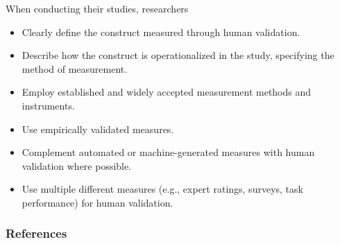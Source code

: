 When conducting their studies, researchers

\must
\begin{itemize}
    \item Clearly define the construct measured through human validation.
    \item Describe how the construct is operationalized in the study, specifying the method of measurement.
    \item Employ established and widely accepted measurement methods and instruments.
\end{itemize}


\should
\begin{itemize}
    \item Use empirically validated measures.
    \item Complement automated or machine-generated measures with human validation where possible.
\end{itemize}

\may
\begin{itemize}
    \item Use multiple different measures (e.g., expert ratings, surveys, task performance) for human validation.
\end{itemize}

\subsubsection{References}





